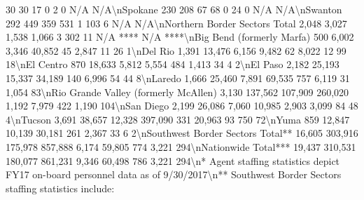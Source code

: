 \documentclass[
  12pt,
  openany]{book}
\newenvironment{Shaded}{\begin{snugshade}}{\end{snugshade}}
\begin{document}
\begin{Shaded}
\begin{Highlighting}[]
            30                        30                     17                 0                2               0              N/A      N/A\textbackslash{}nSpokane                                           230                208                       67                     68                 0               24               0              N/A      N/A\textbackslash{}nSwanton                                           292               449                       359                    531                 1               103               6             N/A      N/A\textbackslash{}nNorthern Border Sectors Total                    2,048             3,027                     1,538                  1,066                3               302              11        N/A ****    N/A   ****\textbackslash{}nBig Bend (formerly Marfa)                         500              6,002                     3,346                  40,852              45              2,847             11             26       1\textbackslash{}nDel Rio                                          1,391             13,476                    6,156                  9,482               62              8,022             12             99       18\textbackslash{}nEl Centro                                         870              18,633                    5,812                  5,554              484              1,413             34             4        2\textbackslash{}nEl Paso                                          2,182             25,193                   15,337                  34,189             140              6,996             54             44       8\textbackslash{}nLaredo                                           1,666             25,460                    7,891                  69,535             757              6,119             31            1,054     83\textbackslash{}nRio Grande Valley (formerly McAllen)             3,130            137,562                  107,909                 260,020            1,192             7,979            422            1,190    104\textbackslash{}nSan Diego                                        2,199             26,086                    7,060                  10,985            2,903             3,099             84             48       4\textbackslash{}nTucson                                           3,691             38,657                   12,328                 397,090             331             20,963             93            750       72\textbackslash{}nYuma                                              859              12,847                   10,139                  30,181             261              2,367             33             6        2\textbackslash{}nSouthwest Border Sectors Total**                16,605            303,916                  175,978                 857,888            6,174            59,805            774            3,221    294\textbackslash{}nNationwide Total***                             19,437            310,531                  180,077                 861,231            9,346            60,498            786            3,221    294\textbackslash{}n* Agent staffing statistics depict FY17 on{-}board personnel data as of 9/30/2017\textbackslash{}n** Southwest Border Sectors staffing statistics include: 
\end{Highlighting}
\end{Shaded}
\end{document}

